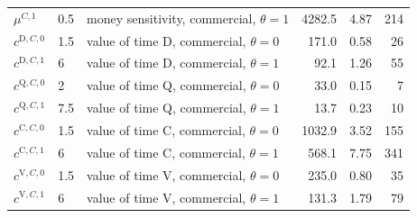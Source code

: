 \begin{tabular}{llp{5.2cm}rrr}
$\mu^{C,1}$ & 0.5 & money sensitivity, commercial, $\theta=1$ & 4282.5 & 4.87 & 214 \\
$c^{\mathrm{D},C,0}$ & 1.5 & value of time D, commercial, $\theta=0$ & 171.0 & 0.58 & 26 \\
$c^{\mathrm{D},C,1}$ & 6 & value of time D, commercial, $\theta=1$ & 92.1 & 1.26 & 55 \\
$c^{\mathrm{Q},C,0}$ & 2 & value of time Q, commercial, $\theta=0$ & 33.0 & 0.15 & 7 \\
$c^{\mathrm{Q},C,1}$ & 7.5 & value of time Q, commercial, $\theta=1$ & 13.7 & 0.23 & 10 \\
$c^{\mathrm{C},C,0}$ & 1.5 & value of time C, commercial, $\theta=0$ & 1032.9 & 3.52 & 155 \\
$c^{\mathrm{C},C,1}$ & 6 & value of time C, commercial, $\theta=1$ & 568.1 & 7.75 & 341 \\
$c^{\mathrm{V},C,0}$ & 1.5 & value of time V, commercial, $\theta=0$ & 235.0 & 0.80 & 35 \\
$c^{\mathrm{V},C,1}$ & 6 & value of time V, commercial, $\theta=1$ & 131.3 & 1.79 & 79 \\
\bottomrule\end{tabular}
